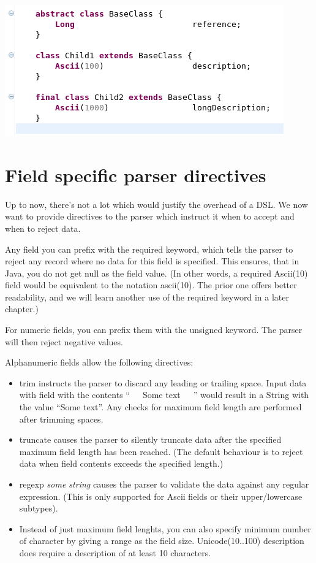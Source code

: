 \documentclass[11pt,a4paper,oneside]{article}
\begin{document}
\vspace{2mm}
\hspace{1cm}\includegraphics[scale=0.5]{images/tut1-007.png}


\section{Field specific parser directives}
Up to now, there's not a lot which would justify the overhead of a DSL.  
We now want to provide directives to the parser which instruct it when to accept and when to reject data. 

Any field you can prefix with the {\ttfamily required} keyword, which tells the parser to reject any record where no data for this field is specified.
This ensures, that in Java, you do not get {\ttfamily null} as the field value. (In other words, a {\ttfamily required
Ascii(10)} field would be equivalent to the notation {\ttfamily ascii(10)}.
The prior one offers better readability, and we will learn another use of the {\ttfamily required} keyword in a later chapter.)

For numeric fields, you can prefix them with the {\ttfamily unsigned} keyword. The parser will then reject negative values.

Alphanumeric fields allow the following directives:
\begin{itemize}
  \item {\ttfamily trim} instructs the parser to discard any leading or trailing space. Input data with field with the contents ``\ \ \ Some text\ \ \  '' would result in a String with the
  value ``Some text''. Any checks for maximum field length are performed after trimming spaces.
  \item {\ttfamily truncate} causes the parser to silently truncate data after the specified maximum field length has been reached.
   (The default behaviour is to reject data when field contents exceeds the specified length.) 
   \item {\ttfamily regexp} {\it{some string}} causes the parser to validate the data against any regular expression. (This is only supported for
     {\ttfamily Ascii} fields or their upper/lowercase subtypes).
   \item Instead of just maximum field lenghts, you can also specify minimum number of character by giving a range as the field size.
    {\ttfamily Unicode(10..100) description} does require a description of at least 10 characters. 
\end{itemize}
\end{document}
